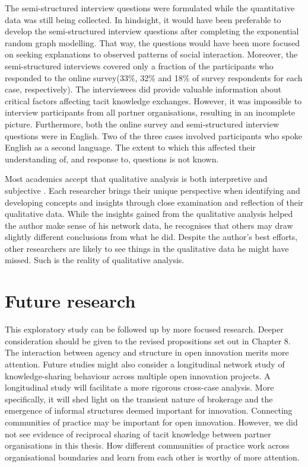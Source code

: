 The semi-structured interview questions were formulated while the quantitative data was still being collected. In hindsight, it would have been preferable to develop the semi-structured interview questions after completing the exponential random graph modelling. That way, the questions would have been more focused on seeking explanations to observed patterns of social interaction. Moreover, the semi-structured interviews covered only a fraction of the participants who responded to the online survey(33\%, 32\% and 18\% of survey respondents for each case, respectively). The interviewees did provide valuable information about critical factors affecting tacit knowledge exchanges. However, it was impossible to interview participants from all partner organisations, resulting in an incomplete picture. Furthermore, both the online survey and semi-structured interview questions were in English. Two of the three cases involved participants who spoke English as a second language. The extent to which this affected their understanding of, and response to, questions is not known. \medskip

Most academics accept that qualitative analysis is both interpretive and subjective \citep{aspers2019qualitative}. Each researcher brings their unique perspective when identifying and developing concepts and insights through close examination and reflection of their qualitative data. While the insights gained from the qualitative analysis helped the author make sense of his network data, he recognises that others may draw slightly different conclusions from what he did. Despite the author's best efforts, other researchers are likely to see things in the qualitative data he might have missed. Such is the reality of qualitative analysis. \medskip
\section{Future research}

This exploratory study can be followed up by more focused research. Deeper consideration should be given to the revised propositions set out in Chapter 8. The interaction between agency and structure in open innovation merits more attention. Future studies might also consider a longitudinal network study of knowledge-sharing behaviour across multiple open innovation projects. A longitudinal study will facilitate a more rigorous cross-case analysis. More specifically, it will shed light on the transient nature of brokerage and the emergence of informal structures deemed important for innovation. \medskip
Connecting communities of practice may be important for open innovation. However, we did not see evidence of reciprocal sharing of tacit knowledge between partner organisations in this thesis. How different communities of practice work across organisational boundaries and learn from each other is worthy of more attention. 

